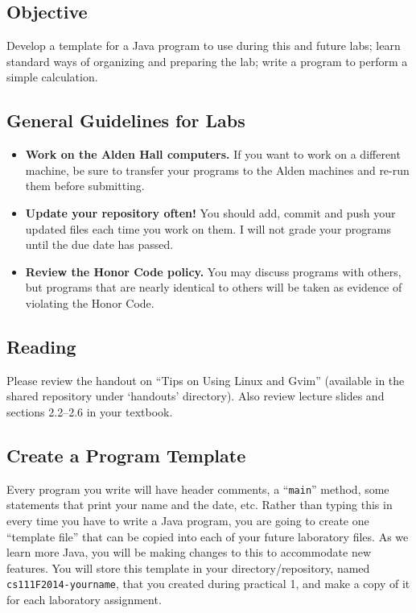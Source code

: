 


\subsection*{Objective}

Develop a template for a Java program to use during this and future labs; learn standard ways of organizing and
preparing the lab; write a program to perform a simple calculation.

\subsection*{General Guidelines for Labs}
\begin{itemize}
\item
{\bf Work on the Alden Hall computers.} If you want to work on a different
machine, be sure to transfer your programs to the Alden
machines and re-run them before submitting.
\item
{\bf Update your repository often!} You should add, commit 
and push your updated files each time you work on them.  I will not grade 
your programs until the due date has passed.
\item
{\bf Review the Honor Code policy.} You
may discuss programs with others, but programs that are nearly identical
to others will be taken as evidence of violating the Honor Code.
\end{itemize}

\subsection*{Reading}
Please review the handout on ``Tips on Using Linux and Gvim'' 
(available in the shared repository under `handouts' directory). 
Also review lecture slides and sections 2.2--2.6 in your textbook.

\subsection*{Create a Program Template}
Every program you write will have header comments, a ``{\tt main}''
method, some statements that print your name and the date, etc. Rather
than typing this in every time you have to write a Java program, 
you are going to create one ``template
file'' that can be copied into each of your future laboratory files. As we learn
more Java, you will be making changes to this to accommodate new
features. You will store this template in your directory/repository, named {\tt cs111F2014-yourname}, that you created during practical 1, and make a copy of it
for each laboratory assignment.

